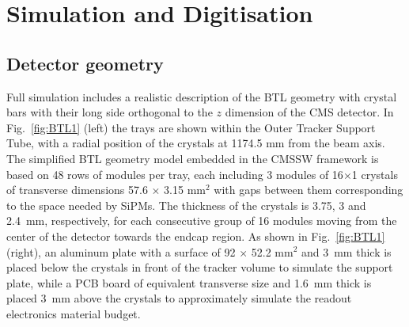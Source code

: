 \section{Simulation and Digitisation}

\subsection{Detector geometry}
\label{sec:geosim}


Full simulation includes a realistic description of the BTL geometry with crystal bars with their long side orthogonal to the $z$ dimension of the CMS detector. In Fig.~\ref{fig:BTL1} (left) the trays are shown within the Outer Tracker Support Tube, with a radial position of the crystals at 1174.5 mm from the beam axis. The simplified BTL geometry model embedded in the CMSSW framework is based on 48 rows of modules per tray, each including 3 modules of 16$\times$1 crystals of transverse dimensions 57.6 $\times$ 3.15 mm$^2$ with gaps between them corresponding to the space needed by SiPMs. The thickness of the crystals is 3.75, 3 and 2.4~mm, respectively, for each consecutive group of 16 modules moving from the center of the detector towards the endcap region. As shown in Fig.~\ref{fig:BTL1} (right), an aluminum plate with a surface of 92 $\times$ 52.2 mm$^2$ and 3~mm thick is placed below the crystals in front of the tracker volume to simulate the support plate, while a PCB board of equivalent transverse size and 1.6~mm thick is placed 3~mm above the crystals to approximately simulate the readout electronics material budget.

